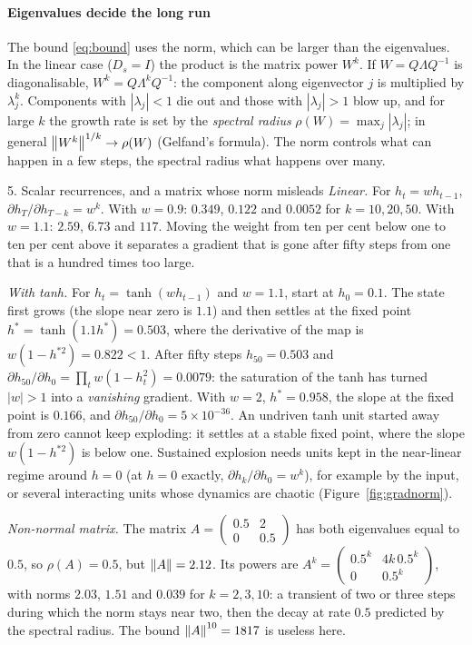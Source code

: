 \documentclass[11pt]{article}
\begin{document}
\paragraph{Eigenvalues decide the long run} The bound \eqref{eq:bound} uses the norm, which can be larger than the
eigenvalues. In the linear case ($D_s = I$) the product is the matrix power $W^k$. If $W = Q\Lambda Q^{-1}$ is
diagonalisable, $W^k = Q\Lambda^kQ^{-1}$: the component along eigenvector $j$ is multiplied by $\lambda_j^k$. Components
with $|\lambda_j| < 1$ die out and those with $|\lambda_j| > 1$ blow up, and for large $k$ the growth rate is set by the
\emph{spectral radius} $\rho(W) = \max_j|\lambda_j|$; in general $\left\lVert W^k \right\rVert^{1/k} \to \rho(W)$ (Gelfand's formula).
The norm controls what can happen in a few steps, the spectral radius what happens over many.

\begin{worked}{5. Scalar recurrences, and a matrix whose norm misleads}
\emph{Linear.} For $h_t = wh_{t-1}$, $\partial h_T/\partial h_{T-k} = w^k$. With $w = 0.9$: $0.349$, $0.122$ and $0.0052$ for
$k = 10, 20, 50$. With $w = 1.1$: $2.59$, $6.73$ and $117$. Moving the weight from ten per cent below one to ten per cent
above it separates a gradient that is gone after fifty steps from one that is a hundred times too large.

\emph{With tanh.} For $h_t = \tanh(wh_{t-1})$ and $w = 1.1$, start at $h_0 = 0.1$. The state first grows (the slope near
zero is $1.1$) and then settles at the fixed point $h^* = \tanh(1.1h^*) = 0.503$, where the derivative of the map is
$w(1 - h^{*2}) = 0.822 < 1$. After fifty steps $h_{50} = 0.503$ and $\partial h_{50}/\partial h_0 = \prod_t w(1 - h_t^2) =
0.0079$: the saturation of the tanh has turned $|w| > 1$ into a \emph{vanishing} gradient. With $w = 2$, $h^* = 0.958$, the
slope at the fixed point is $0.166$, and $\partial h_{50}/\partial h_0 = 5 \times 10^{-36}$. An undriven tanh unit started
away from zero cannot keep exploding: it settles at a stable fixed point, where the slope $w(1 - h^{*2})$ is below one.
Sustained explosion needs units kept in the near-linear regime around $h = 0$ (at $h = 0$ exactly,
$\partial h_k/\partial h_0 = w^k$), for example by the input, or several interacting units whose dynamics are chaotic
(Figure~\ref{fig:gradnorm}).

\emph{Non-normal matrix.} The matrix
$A = \begin{pmatrix} 0.5 & 2 \\ 0 & 0.5 \end{pmatrix}$ has both eigenvalues equal to $0.5$, so $\rho(A) = 0.5$, but
$\left\lVert A \right\rVert = 2.12$. Its powers are $A^k = \begin{pmatrix} 0.5^k & 4k\,0.5^{k} \\ 0 & 0.5^k\end{pmatrix}$, with norms
$2.03$, $1.51$ and $0.039$ for $k = 2, 3, 10$: a transient of two or three steps during which the norm stays near two,
then the decay at rate $0.5$ predicted by the spectral radius. The bound $\left\lVert A \right\rVert^{10} = 1817$ is useless here.
\end{worked}
\end{document}
